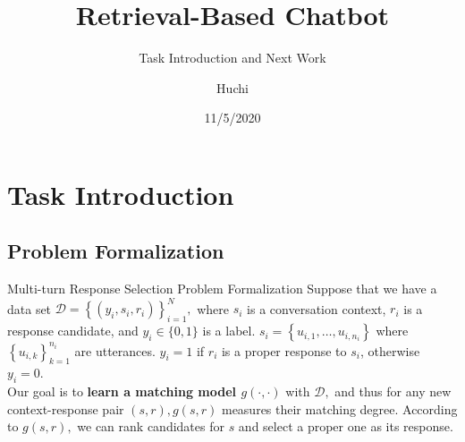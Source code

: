 \documentclass{beamer}
\author{Huchi}
\title{Retrieval-Based Chatbot}
\subtitle{Task Introduction and Next Work}
\institute{Natural Language Processing Research Group \\  Nanjing University}
\date{11/5/2020}
\begin{document}
\kaishu
\begin{frame}
    \titlepage
    \begin{figure}[htpb]
        \begin{center}
        \end{center}
    \end{figure}
\end{frame}

\begin{frame}
    \tableofcontents[sectionstyle=show,subsectionstyle=show/shaded/hide,subsubsectionstyle=show/shaded/hide]
\end{frame}


\section{Task Introduction}


\subsection{Problem Formalization}
\begin{frame} {Multi-turn Response Selection Problem Formalization}
Suppose that we have a data set $\mathcal{D}=\left\{\left(y_{i}, s_{i}, r_{i}\right)\right\}_{i=1}^{N},$ where $s_{i}$ is a conversation context, $r_{i}$ is a response candidate, and $y_{i} \in\{0,1\}$ is a label. $s_{i}=\left\{u_{i, 1}, \ldots, u_{i, n_{i}}\right\}$ where $\left\{u_{i, k}\right\}_{k=1}^{n_{i}}$ are utterances. $y_{i}=1$ if $r_{i}$ is a proper response to $s_{i}$, otherwise $y_{i}=0 .$
\\
Our goal is to \textbf{learn a matching model $g(\cdot, \cdot)$} with $\mathcal{D},$ and thus for any new context-response pair $(s, r), g(s, r)$ measures their matching degree. According to $g(s, r),$ we can rank candidates for $s$ and select a proper one as its response.
\end{frame}
\end{document}
